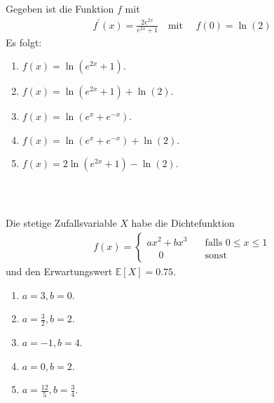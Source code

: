 \subsection*{}
Gegeben ist die Funktion $ f $ mit 
\begin{align*}
	f^\prime(x) = \frac{2 e^{2x}}{e^{2x} + 1} \quad \textrm{mit } \quad f(0) = \ln(2)
\end{align*}
Es folgt:
\renewcommand{\labelenumi}{(\alph{enumi})}
\begin{enumerate}
	\item 
	$f(x) = \ln(e^{2x} +1) $.
	\item
	$f(x) = \ln(e^{2x} +1) + \ln(2) $.
	\item
	$f(x) = \ln(e^{x} +e^{-x}) $.
	\item
	$f(x) = \ln(e^{x} +e^{-x}) + \ln(2) $.	
	\item
	$f(x) = 2 \ln(e^{2x} +1) - \ln(2) $.
\end{enumerate}
\ \\
\subsection*{}
Die stetige Zufallsvariable $ X $ habe die Dichtefunktion
\begin{align*}
	f(x) =
	\begin{cases}
		ax^2 + bx^3 \quad &\textrm{falls } 0 \leq x \leq 1\\
		\quad  \  0 \ \ &\textrm{sonst}
	\end{cases}
\end{align*}
und den Erwartungswert $ \mathbb{E}[X] = 0.75 $.
\renewcommand{\labelenumi}{(\alph{enumi})}
\begin{enumerate}
	\item 
	$a= 3,b=0$.
	\item
	$a= \frac{3}{2},b=2$.
	\item
	$a= -1,b=4$.
	\item
	$a= 0,b=2$.
	\item
	$a= \frac{12}{5},b=\frac{3}{4}$.	
\end{enumerate}
\ \\

